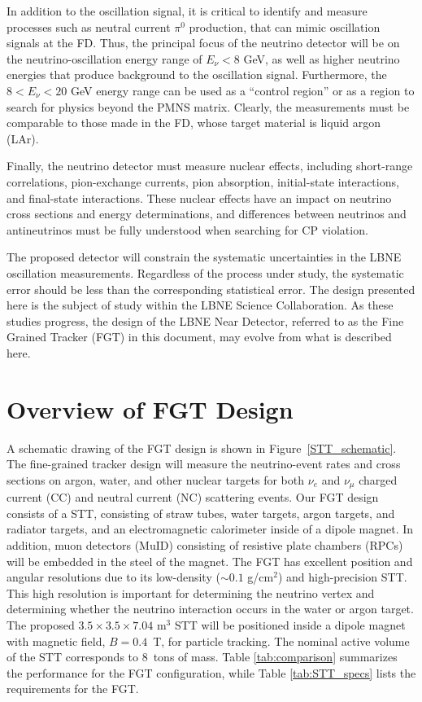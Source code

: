 \documentclass[aps,prl,preprint,groupedaddress]{revtex4}
\begin{document}
In addition to the oscillation signal, it is 
critical to identify and measure processes such as neutral current $\pi^0$ production,
that can mimic oscillation signals 
at the FD. Thus, the principal focus of the neutrino detector will be 
on the neutrino-oscillation energy range of $E_\nu < 8$ GeV, as well as higher 
neutrino energies that produce background to the oscillation signal. Furthermore, the
$8<E_\nu < 20$ GeV energy range can be used as a ``control region'' or
as a region
to search for physics beyond the PMNS matrix. Clearly, 
the measurements must be 
comparable to those made in the FD, whose target material is liquid argon (LAr). 

Finally, the neutrino detector must measure nuclear effects, including
short-range correlations, pion-exchange currents, pion absorption, initial-state interactions, 
and final-state interactions. These nuclear effects %
have an impact on neutrino cross sections and energy determinations, and differences
between neutrinos and antineutrinos must be fully understood when searching
for CP violation.

The proposed detector will constrain the systematic uncertainties in the LBNE 
oscillation measurements. Regardless of the process under study, the 
systematic error should be less than the corresponding statistical error. 
The design presented here is the subject of study within the LBNE Science 
Collaboration. As these studies 
progress, the design of the LBNE Near Detector, 
referred to as the Fine Grained Tracker (FGT) in this document, may 
evolve from what is described here. 

\section{Overview of FGT Design}

A schematic drawing of the 
FGT design is shown in Figure~\ref{STT_schematic}. 
The fine-grained tracker 
design will measure the neutrino-event rates and cross sections 
on argon, water, and other nuclear 
targets for both $\nu_e$ and $\nu_\mu$ charged current (CC) and
neutral current (NC) scattering events. Our FGT design 
consists of a STT, consisting of straw tubes, water targets, argon targets, 
and radiator targets, and an electromagnetic calorimeter inside of a
dipole magnet. In addition, muon detectors (MuID) consisting of resistive plate
chambers (RPCs) will be embedded in the steel
of the magnet. The FGT has excellent position and angular resolutions due to
its low-density ($\sim 0.1$ g/cm$^2$) and high-precision STT. This high 
resolution is important for determining the neutrino
vertex and determining whether the neutrino interaction occurs in the water
or argon target.  The
proposed $3.5\times3.5\times7.04$ m$^3$ STT will be positioned inside a 
dipole magnet with magnetic field, $B = 0.4$~T, for particle tracking.
The nominal active volume of the STT corresponds to 8~tons of mass.
Table \ref{tab:comparison} summarizes the
performance for the FGT configuration, while
Table \ref{tab:STT_specs} lists the requirements for the FGT.
\end{document}
